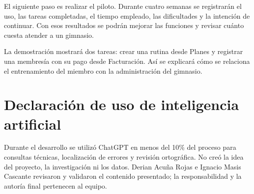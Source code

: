 El siguiente paso es realizar el piloto. Durante cuatro semanas se registrarán
el uso, las tareas completadas, el tiempo empleado, las dificultades y la
intención de continuar. Con esos resultados se podrán mejorar las funciones
y revisar cuánto cuesta atender a un gimnasio.

La demostración mostrará dos tareas: crear una rutina desde Planes y registrar
una membresía con su pago desde Facturación. Así se explicará cómo se relaciona
el entrenamiento del miembro con la administración del gimnasio.

\section{Declaración de uso de inteligencia artificial}

Durante el desarrollo se utilizó ChatGPT en menos del 10\% del proceso para
consultas técnicas, localización de errores y revisión ortográfica. No creó la
idea del proyecto, la investigación ni los datos. Derian Acuña Rojas e Ignacio
Masis Cascante revisaron y validaron el contenido presentado; la responsabilidad
y la autoría final pertenecen al equipo.
